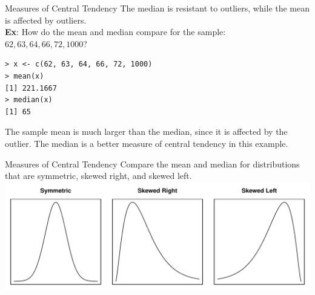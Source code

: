 \documentclass{beamer}
\begin{document}
\begin{frame}[fragile]{Measures of Central Tendency}
The median is resistant to outliers, while the mean is affected by outliers.\\
\vspace{10pt}
\textbf{Ex}: How do the mean and median compare for the sample:\\ $62, 63, 64, 66, 72, 1000$?\\
\begin{verbatim}
> x <- c(62, 63, 64, 66, 72, 1000)
> mean(x)
[1] 221.1667
> median(x)
[1] 65
\end{verbatim}
{\color{blue}
The sample mean is much larger than the median, since it is affected by the outlier.  The median is a better measure of central tendency in this example.
}
\end{frame}

\begin{frame}{Measures of Central Tendency}
Compare the mean and median for distributions that are symmetric, skewed right, and skewed left.\\
\vspace{20pt}
\centering
\includegraphics[scale=0.6]{figure/distributions.pdf}
\end{frame}
\end{document}
